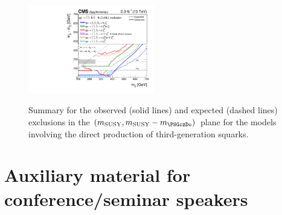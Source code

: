 \clearpage
\begin{figure}[thp!]
  \begin{center}
    \includegraphics[width=0.49\textwidth]{allThirdGenZoomSUMMARY_transposed_aux} \\
    \caption{Summary for the observed (solid lines) and expected
      (dashed lines) exclusions in the $(m_{\mathrm{SUSY}},
      m_{\mathrm{SUSY}} - m_{\PSGczDo})$ plane for the models
      involving the direct production of third-generation squarks. 
      \label{fig:third-gen-summary-zoomed-plots} }
  \end{center}
\end{figure}



\clearpage
\section*{Auxiliary material for conference/seminar speakers}


